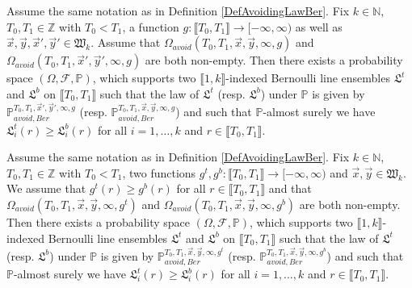 \begin{lemma}\label{MCLxy} Assume the same notation as in Definition \ref{DefAvoidingLawBer}. Fix $k \in \mathbb{N}$, $T_0, T_1 \in \mathbb{Z}$ with $T_0 < T_1$, a function $g: \llbracket T_0, T_1 \rrbracket  \rightarrow [-\infty, \infty)$ as well as $\vec{x}, \vec{y}, \vec{x}', \vec{y}' \in \mathfrak{W}_k$. Assume that $\Omega_{avoid}(T_0, T_1, \vec{x}, \vec{y}, \infty,g)$ and $\Omega_{avoid}(T_0, T_1, \vec{x}', \vec{y}', \infty,g)$ are both non-empty. Then there exists a probability space $(\Omega, \mathcal{F}, \mathbb{P})$, which supports two $\llbracket 1, k \rrbracket$-indexed Bernoulli line ensembles $\mathfrak{L}^t$ and $\mathfrak{L}^b$ on $\llbracket T_0, T_1 \rrbracket$ such that the law of $\mathfrak{L}^{t}$ {\big (}resp. $\mathfrak{L}^b${\big )} under $\mathbb{P}$ is given by $\mathbb{P}_{avoid, Ber}^{T_0, T_1, \vec{x}', \vec{y}', \infty, g}$ {\big (}resp. $\mathbb{P}_{avoid, Ber}^{T_0, T_1, \vec{x}, \vec{y}, \infty, g}${\big )} and such that $\mathbb{P}$-almost surely we have $\mathfrak{L}_i^t(r) \geq \mathfrak{L}^b_i(r)$ for all $i = 1,\dots, k$ and $r \in \llbracket T_0, T_1 \rrbracket$.
\end{lemma}

\begin{lemma}\label{MCLfg} Assume the same notation as in Definition \ref{DefAvoidingLawBer}. Fix $k \in \mathbb{N}$,  $T_0, T_1 \in \mathbb{Z}$ with $T_0 < T_1$, two functions $g^t, g^b: \llbracket T_0, T_1 \rrbracket \rightarrow [-\infty,\infty)$ and $\vec{x}, \vec{y} \in \mathfrak{W}_k$. We assume that $g^t(r) \geq g^b(r)$ for all $r \in \llbracket T_0, T_1 \rrbracket$ and that $\Omega_{avoid}(T_0, T_1, \vec{x}, \vec{y}, \infty,g^t)$ and $\Omega_{avoid}(T_0, T_1, \vec{x}, \vec{y}, \infty,g^b)$ are both non-empty. Then there exists a probability space $(\Omega, \mathcal{F}, \mathbb{P})$, which supports two $\llbracket 1, k \rrbracket$-indexed Bernoulli line ensembles $\mathfrak{L}^t$ and $\mathfrak{L}^b$ on $\llbracket T_0, T_1 \rrbracket$ such that the law of $\mathfrak{L}^{t}$ {\big (}resp. $\mathfrak{L}^b${\big )} under $\mathbb{P}$ is given by $\mathbb{P}_{avoid, Ber}^{T_0, T_1, \vec{x}, \vec{y}, \infty, g^t}$ {\big (}resp. $\mathbb{P}_{avoid, Ber}^{T_0,T_1, \vec{x}, \vec{y}, \infty, g^b}${\big )} and such that $\mathbb{P}$-almost surely we have $\mathfrak{L}_i^t(r) \geq \mathfrak{L}^b_i(r)$ for all $i = 1,\dots, k$ and $r \in \llbracket T_0, T_1 \rrbracket$.
\end{lemma}

